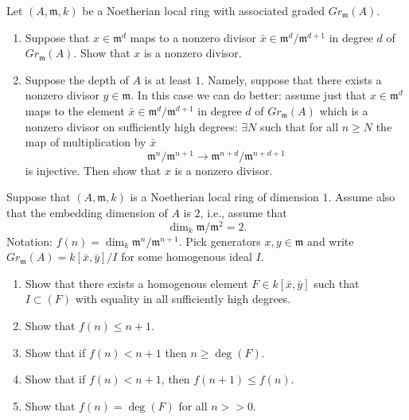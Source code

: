 \begin{exercise}
\label{exercise-nonzerodivisor-graded}
Let $(A, {\mathfrak m}, k)$ be a Noetherian local ring with associated
graded $Gr_{\mathfrak m}(A)$.
\begin{enumerate}
\item Suppose that $x\in {\mathfrak m}^d$ maps to a nonzero
divisor $\bar x \in {\mathfrak m}^d/{\mathfrak m}^{d + 1}$ in degree $d$ of
$Gr_{\mathfrak m}(A)$.
Show that $x$ is a nonzero divisor.
\item Suppose the depth of $A$ is at least $1$.
Namely, suppose that there exists a nonzero divisor $y \in {\mathfrak m}$.
In this case we can do better: assume just that $x\in {\mathfrak m}^d$ maps to
the element $\bar x \in {\mathfrak m}^d/{\mathfrak m}^{d + 1}$ in degree $d$
of $Gr_{\mathfrak m}(A)$ which is a nonzero divisor on sufficiently
high degrees: $\exists N$ such that for all $n \geq N$ the map
of multiplication by $\bar x$
$$
{\mathfrak m}^n/{\mathfrak m}^{n + 1} \longrightarrow
{\mathfrak m}^{n + d}/{\mathfrak m}^{n + d + 1}
$$
is injective. Then show that $x$ is a nonzero divisor.
\end{enumerate}
\end{exercise}

\begin{exercise}
\label{exercise-embedding-2-dim-1}
Suppose that $(A, {\mathfrak m}, k)$ is a Noetherian local ring of
dimension $1$. Assume also that the embedding dimension of $A$ is
$2$, i.e., assume that
$$
\dim_k {\mathfrak m}/{\mathfrak m}^2 = 2.	
$$
Notation: $f(n) = \dim_k {\mathfrak m}^n/{\mathfrak m}^{n + 1}$.
Pick generators $x, y \in {\mathfrak m}$
and write $Gr_{\mathfrak m}(A) = k[\bar x, \bar y]/I$ for some
homogenous ideal $I$.
\begin{enumerate}
\item Show that there exists a homogenous element
$F\in k[\bar x, \bar y]$ such that $I \subset (F)$ with equality
in all sufficiently high degrees.
\item Show that $f(n) \leq n + 1$.
\item Show that if $f(n) < n + 1$ then $n \geq \deg(F)$.
\item Show that if $f(n) < n + 1$, then $f(n + 1) \leq f(n)$.
\item Show that $f(n) = \deg(F)$ for all $n >> 0$.
\end{enumerate}
\end{exercise}

